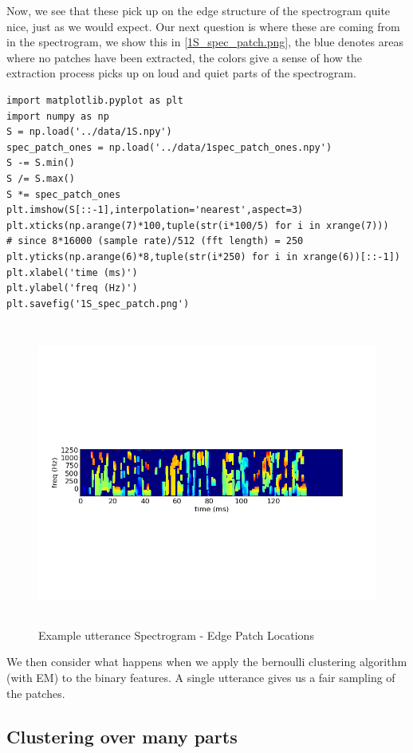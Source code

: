 \documentclass[11pt]{article}
\begin{document}
Now, we see that these pick up on the edge structure of the
spectrogram quite nice, just as we would expect.  Our next question is
where these are coming from in the spectrogram, we show this in
\ref{1S_spec_patch.png}, the blue denotes areas where no patches have
been extracted, the colors give a sense of how the extraction process
picks up on loud and quiet parts of the spectrogram.


\begin{verbatim}
import matplotlib.pyplot as plt
import numpy as np
S = np.load('../data/1S.npy')
spec_patch_ones = np.load('../data/1spec_patch_ones.npy')
S -= S.min()
S /= S.max()
S *= spec_patch_ones
plt.imshow(S[::-1],interpolation='nearest',aspect=3)
plt.xticks(np.arange(7)*100,tuple(str(i*100/5) for i in xrange(7)))
# since 8*16000 (sample rate)/512 (fft length) = 250
plt.yticks(np.arange(6)*8,tuple(str(i*250) for i in xrange(6))[::-1])
plt.xlabel('time (ms)')
plt.ylabel('freq (Hz)')
plt.savefig('1S_spec_patch.png')
\end{verbatim}



\begin{figure}[htb]
\centering
\includegraphics[height=10cm]{./1S_spec_patch.png}
\caption{\label{fig:1S_spec_patch}Example utterance Spectrogram - Edge Patch Locations}
\end{figure}


We then consider what happens when we apply the bernoulli clustering
algorithm (with EM) to the binary features.  A single utterance gives
us a fair sampling of the patches.

\subsection{Clustering over many parts}
\label{sec-2.2}
\end{document}
